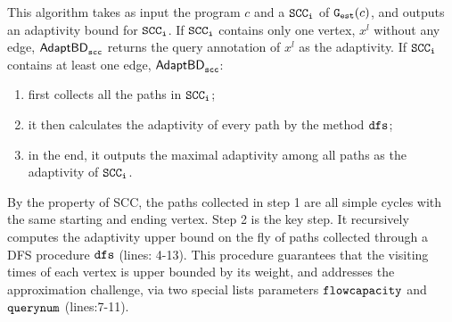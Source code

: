 

This algorithm takes as input the program $c$ and a $\mathtt{SCC_i}$ of
$\mathtt{{G_{est}}}(c)$, and outputs an adaptivity bound for $\mathtt{SCC_i}$. 
If $\mathtt{SCC_i}$ contains only one vertex, $x^l$ without any edge, $\mathtt{\mathsf{AdaptBD}_{scc}}$ returns the query annotation of $x^l$ as the adaptivity.
If $\mathtt{SCC_i}$ contains at least one edge, 
$\mathtt{\mathsf{AdaptBD}_{scc}}$:
\begin{enumerate}
\item first collects all the paths in $\mathtt{SCC_i}$; 
\item it then calculates the adaptivity of every path by the method $\mathtt{dfs}$; 
\item in the end, it outputs the maximal adaptivity among all paths as the adaptivity of $\mathtt{SCC_i}$.
\end{enumerate}
By the property of SCC, the paths collected in step 1 are all simple cycles with the same starting and ending vertex. 
Step 2 is the key step. It recursively computes the adaptivity upper bound on the fly of paths collected through a DFS procedure $\mathtt{dfs}$ (lines: 4-13). This procedure guarantees that the visiting times of each vertex is upper bounded by its weight, and addresses the approximation challenge,
via two special lists parameters $\mathtt{flowcapacity}$ and $\mathtt{querynum}$ (lines:7-11).
 
